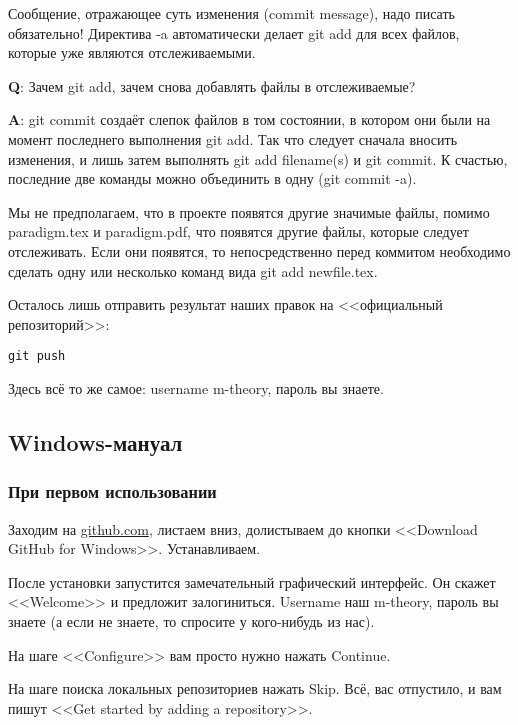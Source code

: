 \documentclass[11pt]{article}
\theoremstyle{remark}
\theoremstyle{definition}
\begin{document}
Сообщение, отражающее суть изменения (commit message), надо писать обязательно! Директива -a автоматически делает git add для всех файлов, которые уже являются отслеживаемыми.

\footnotesize{}

\textbf{Q}: Зачем git add, зачем снова добавлять файлы в отслеживаемые?

\textbf{A}: git commit создаёт слепок файлов в том состоянии, в котором они были на момент последнего выполнения git add. Так что следует сначала вносить изменения, и лишь затем выполнять git add filename(s) и git commit. К счастью, последние две команды можно объединить в одну (git commit -a).

\normalsize{}

Мы не предполагаем, что в проекте появятся другие значимые файлы, помимо paradigm.tex и paradigm.pdf, что появятся другие файлы, которые следует отслеживать. Если они появятся, то непосредственно перед коммитом необходимо сделать одну или несколько команд вида git add newfile.tex.

Осталось лишь отправить результат наших правок на <<официальный репозиторий>>:

\begin{verbatim}git push\end{verbatim}
Здесь всё то же самое: username m-theory, пароль вы знаете.




\subsection{Windows-мануал}


\subsubsection{При первом использовании}

Заходим на \href{https://github.com/}{\textcolor[rgb]{0.38,0.69,0.82}{github.com}}, листаем вниз, долистываем до кнопки <<Download GitHub for Windows>>. Устанавливаем.

После установки запустится замечательный графический интерфейс. Он скажет <<Welcome>> и предложит залогиниться. Username наш m-theory, пароль вы знаете (а если не знаете, то спросите у кого-нибудь из нас). 

На шаге <<Configure>> вам просто нужно нажать Continue.

На шаге поиска локальных репозиториев нажать Skip. Всё, вас отпустило, и вам пишут <<Get started by adding a repository>>.
\end{document}
